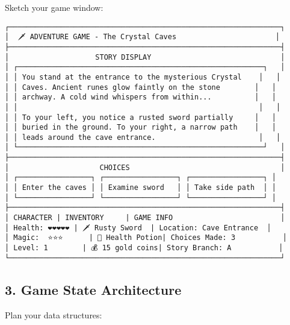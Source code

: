 \documentclass[
  letterpaper,
  DIV=11,
  numbers=noendperiod,
  oneside]{scrreprt}
\begin{document}
Sketch your game window:

\begin{verbatim}
┌───────────────────────────────────────────────────────────────┐
│  🗡️ ADVENTURE GAME - The Crystal Caves                       │
├───────────────────────────────────────────────────────────────┤
│                    STORY DISPLAY                              │
│ ┌─────────────────────────────────────────────────────────┐   │
│ │ You stand at the entrance to the mysterious Crystal    │   │
│ │ Caves. Ancient runes glow faintly on the stone        │   │
│ │ archway. A cold wind whispers from within...          │   │
│ │                                                        │   │
│ │ To your left, you notice a rusted sword partially     │   │
│ │ buried in the ground. To your right, a narrow path    │   │
│ │ leads around the cave entrance.                        │   │
│ └─────────────────────────────────────────────────────────┘   │
├───────────────────────────────────────────────────────────────┤
│                     CHOICES                                   │
│ ┌─────────────────┐ ┌─────────────────┐ ┌─────────────────┐ │
│ │ Enter the caves │ │ Examine sword   │ │ Take side path  │ │
│ └─────────────────┘ └─────────────────┘ └─────────────────┘ │
├───────────────────────────────────────────────────────────────┤
│ CHARACTER | INVENTORY     | GAME INFO                         │
│ Health: ❤️❤️❤️❤️❤️ | 🗡️ Rusty Sword  | Location: Cave Entrance  │
│ Magic:  ⭐⭐⭐      | 🧪 Health Potion| Choices Made: 3           │
│ Level: 1        | 💰 15 gold coins| Story Branch: A           │
└───────────────────────────────────────────────────────────────┘
\end{verbatim}

\subsection{3. Game State Architecture}\label{game-state-architecture}

Plan your data structures:
\end{document}
